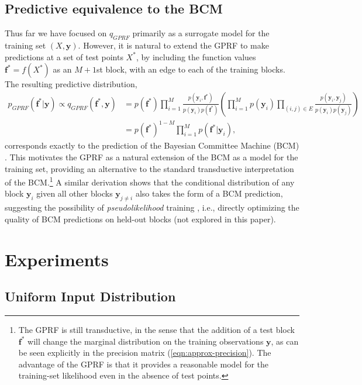 \documentclass{article}
\renewcommand{\v}[1]{\mathbf{#1}}
\begin{document}
\subsection{Predictive equivalence to the BCM}
\label{sec:approx-predict}
\vspace{-.2cm}
Thus far we have focused on $q_{GPRF}$ primarily as a surrogate model
for the training set $(X, \v{y})$.  However, it is natural to extend
the GPRF to make predictions at a set of test points $X^*$, by including the
function values $\v{f}^* = f(X^*)$ as an $M+1$st block, with an edge to each of the training blocks. The resulting
predictive distribution,
\begin{align}
p_{GPRF}(\v{f}^* | \v{y}) \propto q_{GPRF}(\v{f}^*, \v{y}) 
&= p(\v{f}^*) \prod_{i=1}^M \frac{p(\v{y}_i,
  \v{f}^*)}{p(\v{y}_i) p(\v{f}^*)} \left(\prod_{i=1}^M p(\v{y}_i) \prod_{(i,j)\in E} \frac{p(\v{y}_i, \v{y}_j)}{p(\v{y}_i)
    p(\v{y}_j)}\right)  \nonumber \\
&=p(\v{f}^*)^{1-M} \prod_{i=1}^M p(\v{f}^* | \v{y}_i),
\end{align}
corresponds exactly to the prediction of 
the Bayesian Committee Machine (BCM) \citep{tresp2000bayesian}. This motivates the
GPRF as a natural extension of the BCM as a model for the training
set, providing an alternative to the standard transductive
interpretation of the BCM.\footnote{The GPRF is still transductive, in
  the sense that the addition of a test block $\v{f^*}$ will change the
  marginal distribution on the training observations $\v{y}$, as 
  can be seen explicitly in the precision matrix (\ref{eqn:approx-precision}). The
  advantage of the GPRF is that it provides a reasonable model for
  the training-set likelihood even in the absence of test
  points. } A similar derivation shows that the conditional distribution of any
block $\v{y}_i$ given all other blocks $\v{y}_{j\ne i}$ also takes the
form of a BCM prediction, suggesting the possibility of
{\em pseudolikelihood} training \cite{besag1975statistical}, i.e.,
directly optimizing the quality of BCM predictions on held-out blocks
(not explored in this paper).


\section{Experiments}

\subsection{Uniform Input Distribution}
\end{document}
